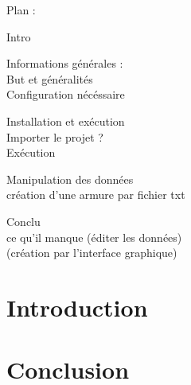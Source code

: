 \documentclass[a4paper]{report}
\begin{document}



\tableofcontents


Plan : 

	Intro

	Informations générales :\\
		But et généralités\\
		Configuration nécéssaire
		
	Installation et exécution\\
		Importer le projet ?\\
		Exécution

	Manipulation des données\\
		création d'une armure par fichier txt

	Conclu\\
		ce qu'il manque (éditer les données)\\
		(création par l'interface graphique)


\chapter*{Introduction}
%


\chapter*{Conclusion}
%
\end{document}
